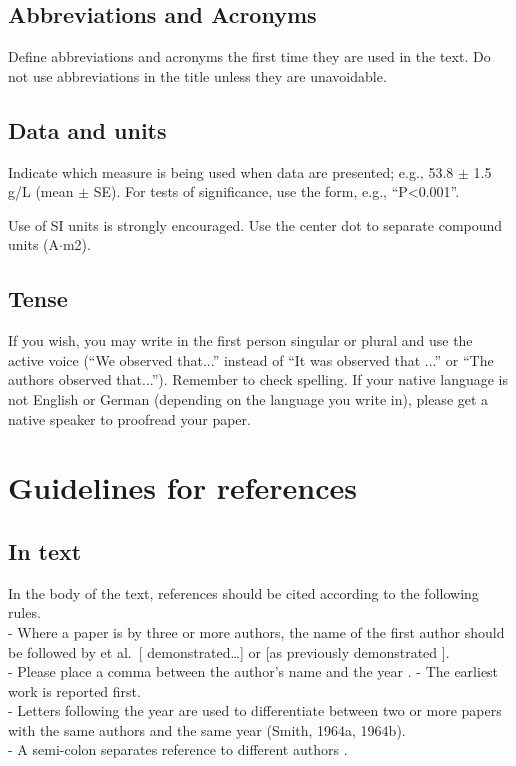 \documentclass[english]{oegatb}
\begin{document}
\subsection{Abbreviations and Acronyms}
Define abbreviations and acronyms the first time they are used in the text.
Do not use abbreviations in the title unless they are unavoidable.

\subsection{Data and units}
Indicate which measure is being used when data are presented;
e.g., 53.8 $\pm$ 1.5 g/L (mean $\pm$ SE).
For tests of significance, use the form, e.g., ``P<0.001''.

Use of SI units is strongly encouraged.
Use the center dot to separate compound units (A$\cdot$m2).

\subsection{Tense}
If you wish, you may write in the first person singular
or plural and use the active voice
(``We observed that...'' instead of ``It was observed that ...'' or
``The authors observed that...'').
Remember to check spelling.
If your native language is not English or German
(depending on the language you write in),
please get a native speaker to proofread your paper.


\section{Guidelines for references}

\subsection{In text}

In the body of the text,
references should be cited according to the following rules.\\
- Where a paper is by three or more authors,
  the name of the first author should be followed by et al.\
  [\citet{hansen04} demonstrated\ldots] or
  [as previously demonstrated \citep{hansen04}].\\
- Please place a comma between the author's name and the year
  \citep{schulze94,hansen95}.
  - The earliest work is reported first.\\
- Letters following the year are used to differentiate between
  two or more papers with the same authors and the same year
  (Smith, 1964a, 1964b).\\
- A semi-colon separates reference to different authors
  \citep{schulze94,hansen04}.
\end{document}
